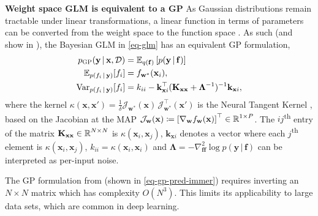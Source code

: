 \documentclass{article}
\newcommand{\weights}{\ensuremath{\mathbf{w}}}
\newcommand{\mbf}[1]{\mathbf{#1}}
\renewcommand{\mid}{\,|\,}
\newcommand{\vf}{\mbf{f}}
\newcommand{\vx}{\mbf{x}}
\newcommand{\vy}{\mbf{y}}
\newcommand{\vw}{\mbf{w}}
\newcommand{\Jac}[2]{\mathcal{J}_{#1}(#2)}
\newcommand{\JacT}[2]{\mathcal{J}_{#1}^\top(#2)}
\newcommand{\MKxx}{\mbf{K}_{\mbf{x}\mbf{x}}}
\newcommand{\vk}{\mbf{k}}
\newcommand{\myexpect}{\mathbb{E}}
\begin{document}
\textbf{Weight space GLM is equivalent to a GP}
As Gaussian distributions remain tractable under linear transformations, a linear function in terms of parameters can be converted from the weight space to the function space \citep[see Ch.~2.1 in ][]{rasmussen2006gaussian}.
As such (and show in \citet{immer2021improving}), the Bayesian GLM in \cref{eq-glm} has an equivalent GP formulation,
\begin{subequations}  \label{eq-gp-pred-immer}
\begin{align}
  p_{\text{\sc GP}}(\vy \mid \vx, \mathcal{D}) &= \E_{q(\vf)} \left[ p(\vy \mid \vf)\right] \\ %
  \myexpect_{p(f_i \mid\vy)}[f_i] &= f_{\vw^{*}}(\vx_{i}), \\
  \mathrm{Var}_{p(f_i \mid \vy)}[f_i] &= k_{ii} - \vk_{\vx i}^\top ( \MKxx + \bm\Lambda^{-1})^{-1} \vk_{\vx i},
\end{align}
\end{subequations}
where the kernel $\kappa(\vx,\vx')=\frac{1}{\delta} \Jac{\weights^*}{\vx} \, \JacT{\weights^*}{\vx'}$ is the Neural Tangent Kernel \citep[NTK,][]{jacot2018neural},
based on the Jacobian at the MAP $\Jac{\weights}{\vx} \coloneqq \left[ \nabla_\weights f_\weights(\vx)\right]^\top \in \R^{1 \times P}$.
The $ij$\textsuperscript{th} entry of the matrix $\MKxx \in \R^{N \times N}$ is $\kappa(\vx_i,\vx_j)$, $\vk_{\vx i}$ denotes a vector where
each $j$\textsuperscript{th} element is $\kappa(\vx_i, \vx_j)$, $k_{ii} = \kappa(\vx_i, \vx_i)$ and $\bm\Lambda = - \nabla^2_{\vf \vf}\log p(\vy \mid \vf)$ can be interpreted as per-input noise.

The GP formulation from \citet{immer2021improving} (shown in \cref{eq-gp-pred-immer})
requires inverting an $N\times N$ matrix which has complexity $O(N^3)$. This limits its applicability to large data sets, which are common in deep learning.
\end{document}
